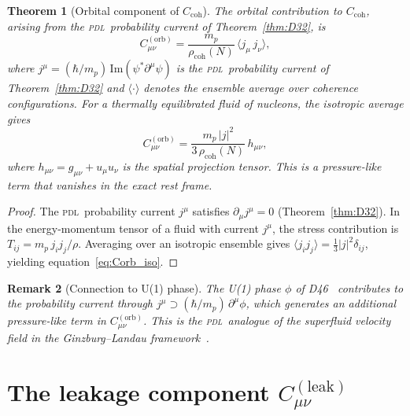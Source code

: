\documentclass[12pt,a4paper]{article}
\newtheorem{theorem}{Theorem}[section]
\newtheorem{remark}[theorem]{Remark}
\newcommand{\hb}{\hbar}
\newcommand{\PDL}{\textsc{pdl}}
\newcommand{\Ccoh}{C_{\mathrm{coh}}}
\newcommand{\Corb}{C^{(\mathrm{orb})}}
\newcommand{\Cleak}{C^{(\mathrm{leak})}}
\newcommand{\rhocoh}{\rho_{\mathrm{coh}}}
\begin{document}
\begin{theorem}[Orbital component of $\Ccoh$]
\label{thm:Corb}
The orbital contribution to $\Ccoh$, arising from the \PDL\ probability current of Theorem~\ref{thm:D32}, is
\begin{equation}
\Corb_{\mu\nu} = \frac{m_p}{\rhocoh(N)}\,\bigl\langle j_\mu\,j_\nu\bigr\rangle,
\label{eq:Corb}
\end{equation}
where $j^\mu = (\hb/m_p)\,\mathrm{Im}(\psi^*\partial^\mu\psi)$ is the \PDL\ probability current of Theorem~\ref{thm:D32} and $\langle\cdot\rangle$ denotes the ensemble average over coherence configurations. For a thermally equilibrated fluid of nucleons, the isotropic average gives
\begin{equation}
\Corb_{\mu\nu} = \frac{m_p\,|j|^2}{3\,\rhocoh(N)}\,h_{\mu\nu},
\label{eq:Corb_iso}
\end{equation}
where $h_{\mu\nu} = g_{\mu\nu} + u_\mu u_\nu$ is the spatial projection tensor. This is a pressure-like term that vanishes in the exact rest frame.
\end{theorem}

\begin{proof}
The \PDL\ probability current $j^\mu$ satisfies $\partial_\mu j^\mu = 0$ (Theorem~\ref{thm:D32}). In the energy-momentum tensor of a fluid with current $j^\mu$, the stress contribution is $T_{ij} = m_p\,j_i j_j/\rho$. Averaging over an isotropic ensemble gives $\langle j_i j_j\rangle = \tfrac{1}{3}|j|^2\delta_{ij}$, yielding equation~\eqref{eq:Corb_iso}.
\end{proof}

\begin{remark}[Connection to U(1) phase]
The U(1) phase $\phi$ of D46~\cite{PDL_D46_2026} contributes to the probability current through $j^\mu \supset (\hb/m_p)\,\partial^\mu\phi$, which generates an additional pressure-like term in $\Corb_{\mu\nu}$. This is the \PDL\ analogue of the superfluid velocity field in the Ginzburg--Landau framework~\cite{Ginzburg_1950}.
\end{remark}

\section{The leakage component \texorpdfstring{$\Cleak_{\mu\nu}$}{C(leak)}}
\label{sec:Cleak}
\end{document}
